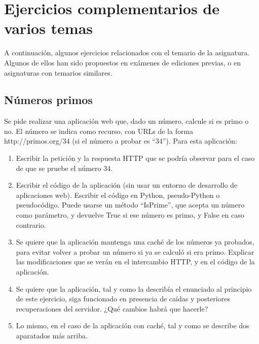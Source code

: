 \section{Ejercicios complementarios de varios temas}

A continuación, algunos ejercicios relacionados con el temario de la asignatura. Algunos de ellos han sido propuestos en exámenes de ediciones previas, o en asignaturas con temarios similares.

\subsection{Números primos}

Se pide realizar una aplicación web que, dado un número, calcule si es primo o no. El número se indica como recurso, con URLs de la forma http://primos.org/34 (si el número a probar es ``34''). Para esta aplicación:

\begin{enumerate}
\item Escribir la petición y la respuesta HTTP que se podría observar para el caso de que se pruebe el número 34.
\item Escribir el código de la aplicación (sin usar un entorno de desarrollo de aplicaciones web). Escribir el código en Python, pseudo-Python o pseudocódigo. Puede usarse un método ``IsPrime'', que acepta un número como parámetro, y devuelve True si ese número es primo, y False en caso contrario.
\item Se quiere que la aplicación mantenga una caché de los números ya probados, para evitar volver a probar un número si ya se calculó si era primo. Explicar las modificaciones que se verán en el intercambio HTTP, y en el código de la aplicación.
\item Se quiere que la aplicación, tal y como la describía el enunciado al principio de este ejercicio, siga funcionado en presencia de caídas y posteriores recuperaciones del servidor. ¿Qué cambios habrá que hacerle?
\item Lo mismo, en el caso de la aplicación con caché, tal y como se describe dos aparatados más arriba.
\end{enumerate}

